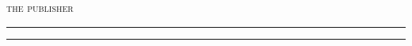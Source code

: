 \begin{titlingpage}
    {\large\textsc{the publisher}} %

    \vspace{0.1\textheight} %


    \rule{\textwidth}{0.4pt} %

    \vspace{2pt}\vspace{-\baselineskip} %

    \rule{\textwidth}{1pt} %

\end{titlingpage}
